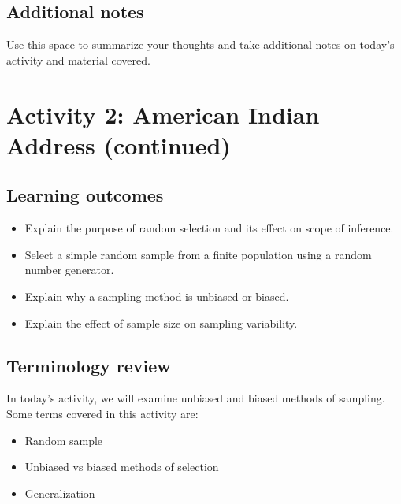 \documentclass[
]{report}
\begin{document}
\hypertarget{additional-notes-1}{%
\subsection{Additional notes}\label{additional-notes-1}}

Use this space to summarize your thoughts and take additional notes on today's activity and material covered.

\newpage

\hypertarget{activity-2-american-indian-address-continued}{%
\section{Activity 2: American Indian Address (continued)}\label{activity-2-american-indian-address-continued}}


\hypertarget{learning-outcomes-2}{%
\subsection{Learning outcomes}\label{learning-outcomes-2}}

\begin{itemize}
\item
  Explain the purpose of random selection and its effect on scope of inference.
\item
  Select a simple random sample from a finite population using a random number generator.
\item
  Explain why a sampling method is unbiased or biased.
\item
  Explain the effect of sample size on sampling variability.
\end{itemize}

\hypertarget{terminology-review-2}{%
\subsection{Terminology review}\label{terminology-review-2}}

In today's activity, we will examine unbiased and biased methods of sampling. Some terms covered in this activity are:

\begin{itemize}
\item
  Random sample
\item
  Unbiased vs biased methods of selection
\item
  Generalization
\end{itemize}
\end{document}
